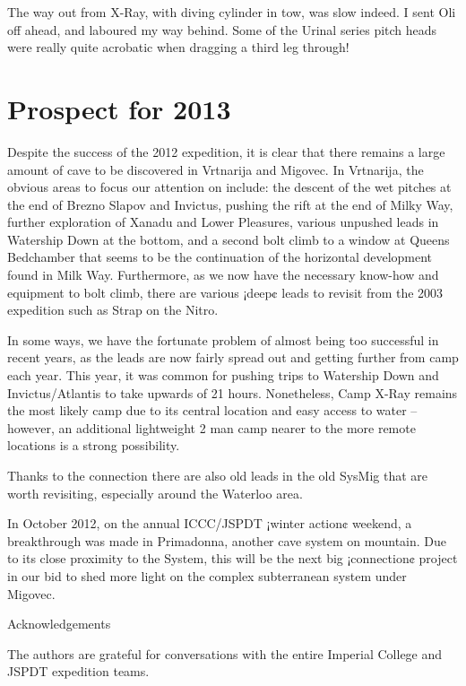 The way out from X-Ray, with diving cylinder in tow, was slow indeed. I
sent Oli off ahead, and laboured my way behind. Some of the Urinal
series pitch heads were really quite acrobatic when dragging a third leg
through!


\section{Prospect for 2013}\label{prospect-for-2013}

Despite the success of the 2012 expedition, it is clear that there
remains a large amount of cave to be discovered in Vrtnarija and
Migovec. In Vrtnarija, the obvious areas to focus our attention on
include: the descent of the wet pitches at the end of Brezno Slapov and
Invictus, pushing the rift at the end of Milky Way, further exploration
of Xanadu and Lower Pleasures, various unpushed leads in Watership Down
at the bottom, and a second bolt climb to a window at Queens Bedchamber
that seems to be the continuation of the horizontal development found in
Milk Way. Furthermore, as we now have the necessary know-how and
equipment to bolt climb, there are various ¡deep¢ leads to revisit from
the 2003 expedition such as Strap on the Nitro.

In some ways, we have the fortunate problem of almost being too
successful in recent years, as the leads are now fairly spread out and
getting further from camp each year. This year, it was common for
pushing trips to Watership Down and Invictus/Atlantis to take upwards of
21 hours. Nonetheless, Camp X-Ray remains the most likely camp due to
its central location and easy access to water -- however, an additional
lightweight 2 man camp nearer to the more remote locations is a strong
possibility.

Thanks to the connection there are also old leads in the old SysMig that
are worth revisiting, especially around the Waterloo area.

In October 2012, on the annual ICCC/JSPDT ¡winter action¢ weekend, a
breakthrough was made in Primadonna, another cave system on mountain.
Due to its close proximity to the System, this will be the next big
¡connection¢ project in our bid to shed more light on the complex
subterranean system under Migovec.

Acknowledgements

The authors are grateful for conversations with the entire Imperial
College and JSPDT expedition teams.

